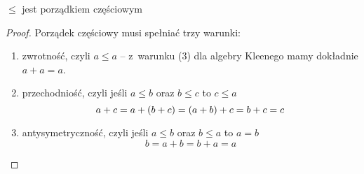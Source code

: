 \begin{lemma}
    \(\leq\) jest porządkiem częściowym
\end{lemma}
\begin{proof} Porządek częściowy musi spełniać trzy warunki:
    \begin{enumerate}
        \item zwrotność, czyli \( a \leq a \) -- z~warunku (3) dla algebry Kleenego mamy dokładnie \(a + a = a\).
        \item przechodniość, czyli jeśli \(a \leq b\) oraz \(b \leq c\) to \(c \leq a\)
            \begin{equation*}
                a + c = a + \left(b + c\right) = \left(a + b\right) + c = b + c = c
            \end{equation*}
        \item antysymetryczność, czyli jeśli \(a \leq b\) oraz \(b \leq a\) to \(a = b \)
            \begin{equation*}
                b = a + b = b + a = a
            \end{equation*}
    \end{enumerate}
\end{proof}
